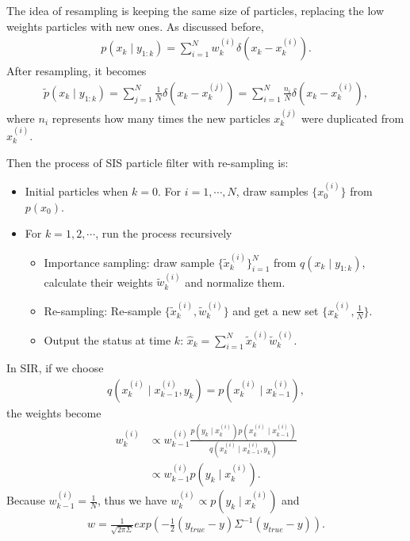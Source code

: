 The idea of resampling is keeping the same size of particles, replacing the low weights particles with new ones. As discussed before, 
\begin{align*}
p(x_k\mid y_{1:k})=\sum_{i=1}^Nw_k^{(i)} \delta (x_k-x_k^{(i)}).
\end{align*}
After resampling, it becomes
\begin{align*}
\tilde{p}(x_k\mid y_{1:k})=\sum_{j=1}^N\frac{1}{N} \delta (x_k-x_k^{(j)})= \sum_{i=1}^N\frac{n_i}{N} \delta (x_k-x_k^{(i)}),
\end{align*}
where $n_i$ represents how many times the new particles $x_k^{(j)}$ were duplicated from$x_k^{(i)}$. 

Then the process of SIS particle filter with re-sampling is:
\begin{itemize}
\item Initial particles when $k=0$. For $i=1, \cdots, N$, draw samples $\{x_0^{(i)}\}$ from $p(x_0)$.
\item For $k=1,2,\cdots$, run the process recursively
\begin{itemize}
\item Importance sampling: draw sample $\{\tilde{x}_k^{(i)}\}_{i=1}^N$ from $q(x_k\mid y_{1:k})$, calculate their weights $\tilde{w}_k^{(i)}$ and normalize them.
\item Re-sampling: Re-sample $\{\tilde{x}_k^{(i)}, \tilde{w}_k^{(i)}\}$ and get a new set $\{x_k^{(i)},\frac{1}{N}\}$.
\item Output the status at time $k$: $\hat{x}_k=\sum_{i=1}^{N}\tilde{x}_k^{(i)}\tilde{w}_k^{(i)}$.
\end{itemize}
\end{itemize}

In SIR, if we choose
\begin{align*}
q(x_k^{(i)}\mid x_{k-1}^{(i)},y_k) = p(x_k^{(i)}\mid x_{k-1}^{(i)}),
\end{align*}
the weights become
\begin{align*}
w_k^{(i)}&\propto w_{k-1}^{(i)}\frac{ p(y_k\mid x_{k}^{(i)}) p(x_k^{(i)}\mid x_{k-1}^{(i)}) }{q(x_k^{(i)}\mid x_{k-1}^{(i)},y_k) }\\
&\propto w_{k-1}^{(i)}p(y_k\mid x_{k}^{(i)}).
\end{align*}
Because $w_{k-1}^{(i)}=\frac{1}{N}$, thus we have $w_k^{(i)} \propto p(y_k\mid x_{k}^{(i)})$ and
\begin{align*}
w=\frac{1}{\sqrt{2\pi\Sigma}}exp\left(-\frac{1}{2} (y_{true}-y)\Sigma^{-1}(y_{true}-y)\right).
\end{align*}



